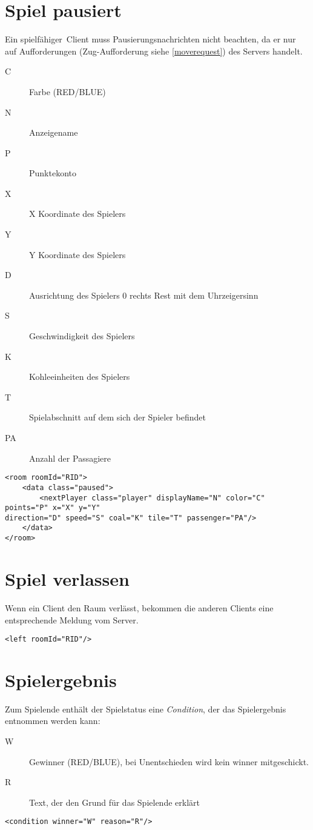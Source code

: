 \documentclass[12pt,a4paper, ngerman, oneside]{scrartcl}
\begin{document}
\section{Spiel pausiert}
Ein \glqq spielfähiger\grqq\ Client muss Pausierungsnachrichten nicht beachten,
da er nur auf Aufforderungen (Zug-Aufforderung siehe \ref{moverequest}) des Servers handelt.
\begin{description}
\item[C] Farbe (RED/BLUE)
\item[N] Anzeigename
\item[P] Punktekonto
\item[X] X Koordinate des Spielers
\item[Y] Y Koordinate des Spielers
\item[D] Ausrichtung des Spielers 0 rechts Rest mit dem Uhrzeigersinn
\item[S] Geschwindigkeit des Spielers
\item[K] Kohleeinheiten des Spielers
\item[T] Spielabschnitt auf dem sich der Spieler befindet
\item[PA] Anzahl der Passagiere
\end{description}
\begin{verbatim}
<room roomId="RID">
	<data class="paused">
		<nextPlayer class="player" displayName="N" color="C" points="P" x="X" y="Y" 
direction="D" speed="S" coal="K" tile="T" passenger="PA"/>
	</data>
</room>
\end{verbatim}

\section{Spiel verlassen}
Wenn ein Client den Raum verlässt, bekommen die anderen Clients eine entsprechende Meldung vom Server.
\begin{verbatim}
<left roomId="RID"/>
\end{verbatim}


\section{\label{gameend}Spielergebnis}
Zum Spielende enthält der Spielstatus eine \textit{Condition}, der das Spielergebnis entnommen werden kann:
\begin{description}
\item[W] Gewinner (RED/BLUE), bei Unentschieden wird kein winner mitgeschickt.
\item[R] Text, der den Grund für das Spielende erklärt
\end{description}
\begin{verbatim}
<condition winner="W" reason="R"/>
\end{verbatim}
\end{document}
